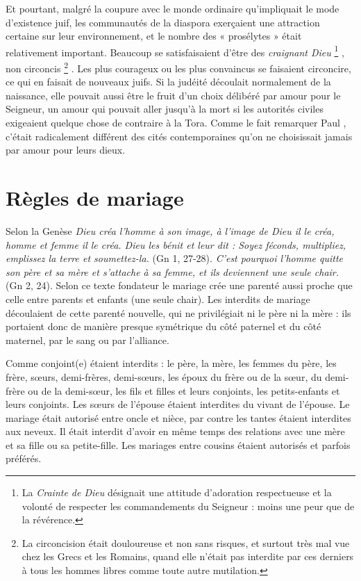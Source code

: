  Et pourtant, malgré la coupure avec le monde ordinaire qu'impliquait le mode d'existence juif, les communautés de la diaspora exerçaient une attraction certaine sur leur environnement, et le nombre des « prosélytes » était relativement important. Beaucoup se satisfaisaient d'être des \emph{craignant Dieu}%
\footnote{La \emph{Crainte de Dieu} désignait une attitude d'adoration respectueuse et la volonté de respecter les commandements du Seigneur : moins une peur que de la révérence.}%
, non circoncis%
\footnote{La circoncision était douloureuse et non sans risques, et surtout très mal vue chez les Grecs et les Romains, quand elle n'était pas interdite par ces derniers à tous les hommes libres comme toute autre mutilation.}%
. Les plus courageux ou les plus convaincus se faisaient circoncire, ce qui en faisait de nouveaux juifs. Si la judéité découlait normalement de la naissance, elle pouvait aussi être le fruit d'un choix délibéré par amour pour le Seigneur, un amour qui pouvait aller jusqu'à la mort si les autorités civiles exigeaient quelque chose de contraire à la Tora. Comme le fait remarquer Paul , c'était radicalement différent des cités contemporaines qu'on ne choisissait jamais par amour pour leurs dieux.

 
 
 
\section{Règles de mariage}

 
 
 Selon la Genèse \emph{Dieu créa l'homme à son image, à l'image de Dieu il le créa, homme et femme il le créa. Dieu les bénit et leur dit : Soyez féconds, multipliez, emplissez la terre et soumettez-la.} (Gn 1, 27-28). \emph{C'est pourquoi l'homme quitte son père et sa mère et s'attache à sa femme, et ils deviennent une seule chair.} (Gn 2, 24). Selon ce texte fondateur le mariage crée une parenté aussi proche que celle entre parents et enfants (une seule chair). Les interdits de mariage découlaient de cette parenté nouvelle, qui ne privilégiait ni le père ni la mère : ils portaient donc de manière presque symétrique du côté paternel et du côté maternel, par le sang ou par l'alliance.
 
 Comme conjoint(e) étaient interdits : le père, la mère, les femmes du père, les frère, sœurs, demi-frères, demi-sœurs, les époux du frère ou de la sœur, du demi-frère ou de la demi-sœur, les fils et filles et leurs conjoints, les petits-enfants et leurs conjoints. Les sœurs de l'épouse étaient interdites du vivant de l'épouse. Le mariage était autorisé entre oncle et nièce, par contre les tantes étaient interdites aux neveux. Il était interdit d'avoir en même temps des relations avec une mère et sa fille ou sa petite-fille. Les mariages entre cousins étaient autorisés et parfois préférés. 
 
